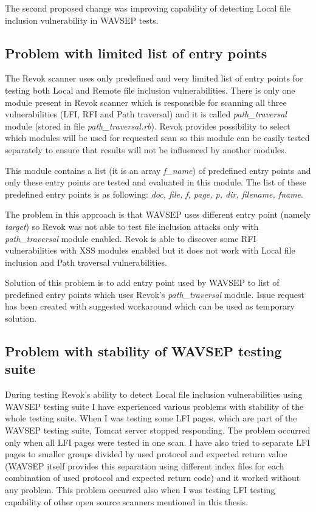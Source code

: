 	The second proposed change was improving capability of detecting Local file inclusion vulnerability in WAVSEP tests.
	
		\subsection{Problem with limited list of entry points}\label{lfi-problem-1}
		
		The Revok scanner uses only predefined and very limited list of entry points for testing both Local and Remote file inclusion vulnerabilities. There is only one module present in Revok scanner which is responsible for scanning all three vulnerabilities (LFI, RFI and Path traversal) and it is called \textit{path\_traversal} module (stored in file \textit{path\_traversal.rb}). Revok provides possibility to select which modules will be used for requested scan so this module can be easily tested separately to ensure that results will not be influenced by another modules.
		
		This module contains a list (it is an array \textit{f\_name}) of predefined entry points and only these entry points are tested and evaluated in this module. The list of these predefined entry points is as following: \textit{doc, file, f, page, p, dir, filename, fname}.
		
		The problem in this approach is that WAVSEP uses different entry point (namely \textit{target}) so Revok was not able to test file inclusion attacks only with \textit{path\_traversal} module enabled. Revok is able to discover some RFI vulnerabilities with XSS modules enabled but it does not work with Local file inclusion and Path traversal vulnerabilities.
		
		Solution of this problem is to add entry point used by WAVSEP to list of predefined entry points which uses Revok's \textit{path\_traversal} module. Issue request \cite{GitHubIssue3} has been created with suggested workaround which can be used as temporary solution.
		
		\subsection{Problem with stability of WAVSEP testing suite}\label{lfi-problem-2}
		
		During testing Revok's ability to detect Local file inclusion vulnerabilities using WAVSEP testing suite I have experienced various problems with stability of the whole testing suite. When I was testing some LFI pages, which are part of the WAVSEP testing suite, Tomcat server stopped responding. The problem occurred only when all LFI pages were tested in one scan. I have also tried to separate LFI pages to smaller groups divided by used protocol and expected return value (WAVSEP itself provides this separation using different index files for each combination of used protocol and expected return code) and it worked without any problem. This problem occurred also when I was testing LFI testing capability of other open source scanners mentioned in this thesis.
		
